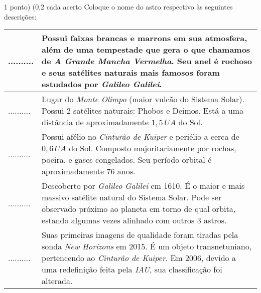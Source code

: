 \documentclass{../lista}
\begin{document}
	\begin{questao}{1 ponto) (0,2 cada acerto}
		Coloque o nome do astro respectivo às seguintes descrições:
		\begin{center} \begin{tabular}{|M{0.2\textwidth}|M{0.65\textwidth}|}
			\hline
			.......... & Possui faixas brancas e marrons em sua atmosfera, além de uma tempestade que gera o que chamamos de \textit{A Grande Mancha Vermelha}. Seu anel é rochoso e seus satélites naturais mais famosos foram estudados por \textit{Galileo Galilei}. \\ \hline
			.......... & Lugar do \textit{Monte Olimpo} (maior vulcão do Sistema Solar). Possui 2 satélites naturais: Phobos e Deimos. Está a uma distância de aproximadamente $1,5 \, UA$ do Sol. \\ \hline
			.......... & Possui afélio no \textit{Cinturão de Kuiper} e periélio a cerca de $0,6 \, UA$ do Sol. Composto majoritariamente por rochas, poeira, e gases congelados. Seu período orbital é aproximadamente $76$ anos. \\ \hline
			.......... & Descoberto por \textit{Galileo Galilei} em 1610. É o maior e mais massivo satélite natural do Sistema Solar. Pode ser observado próximo ao planeta em torno de qual orbita, estando algumas vezes alinhado com outros 3 astros.  \\ \hline
			.......... & Suas primeiras imagens de qualidade foram tiradas pela sonda \textit{New Horizons} em 2015. É um objeto transnetuniano, pertencendo ao \textit{Cinturão de Kuiper}. Em 2006, devido a uma redefinição feita pela \textit{IAU}, sua classificação foi alterada. \\ \hline
		\end{tabular} \end{center}
	\end{questao}
\end{document}
